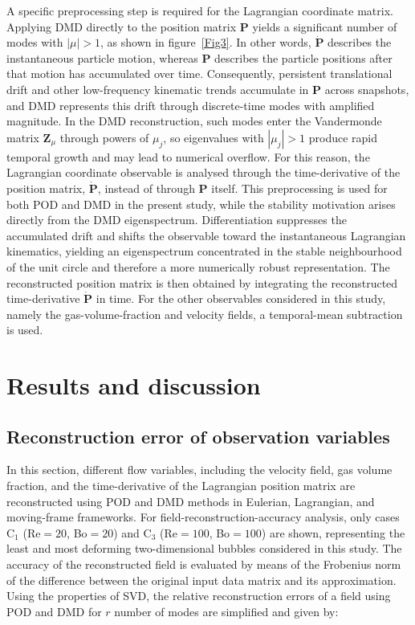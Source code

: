 \documentclass[a4paper,fleqn]{cas-sc}
\begin{document}
	A specific preprocessing step is required for the Lagrangian coordinate matrix. Applying DMD directly to the position matrix $\mathbf{P}$ yields a significant number of modes with $|\mu|>1$, as shown in figure~\ref{Fig3}. In other words, $\dot{\mathbf{P}}$ describes the instantaneous particle motion, whereas $\mathbf{P}$ describes the particle positions after that motion has accumulated over time. Consequently, persistent translational drift and other low-frequency kinematic trends accumulate in $\mathbf{P}$ across snapshots, and DMD represents this drift through discrete-time modes with amplified magnitude. In the DMD reconstruction, such modes enter the Vandermonde matrix $\mathbf{Z}_{\mu}$ through powers of $\mu_j$, so eigenvalues with $|\mu_j|>1$ produce rapid temporal growth and may lead to numerical overflow. For this reason, the Lagrangian coordinate observable is analysed through the time-derivative of the position matrix, $\dot{\mathbf{P}}$, instead of through $\mathbf{P}$ itself. This preprocessing is used for both POD and DMD in the present study, while the stability motivation arises directly from the DMD eigenspectrum. Differentiation suppresses the accumulated drift and shifts the observable toward the instantaneous Lagrangian kinematics, yielding an eigenspectrum concentrated in the stable neighbourhood of the unit circle and therefore a more numerically robust representation. The reconstructed position matrix is then obtained by integrating the reconstructed time-derivative $\dot{\mathbf{P}}$ in time. For the other observables considered in this study, namely the gas-volume-fraction and velocity fields, a temporal-mean subtraction is used.
	
	\section{Results and discussion}
	\label{Results and discussion}
	
	
	\subsection{Reconstruction error of observation variables}
	
	In this section, different flow variables, including the velocity field, gas volume fraction, and the time-derivative of the Lagrangian position matrix are reconstructed using POD and DMD methods in Eulerian, Lagrangian, and moving-frame frameworks. For field-reconstruction-accuracy analysis, only cases C$_1$ (Re$=20$, Bo$=20$) and C$_3$ (Re$=100$, Bo$=100$) are shown, representing the least and most deforming two-dimensional bubbles considered in this study. The accuracy of the reconstructed field is evaluated by means of the Frobenius norm of the difference between the original input data matrix and its approximation. Using the properties of SVD, the relative reconstruction errors of a field using POD and DMD for $r$ number of modes are simplified and given by:
	
\end{document}
